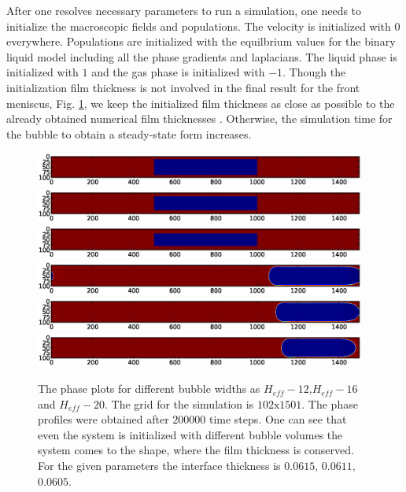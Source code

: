 \documentclass{article}
\begin{document}
After one resolves necessary parameters to run a simulation, one needs to
initialize the macroscopic fields and populations.
The velocity is initialized with $0$ everywhere. Populations are initialized
with the equilbrium values for the binary liquid model including all the phase
gradients and laplacians. The liquid phase is initialized with $1$ and the
gas phase is initialized with $-1$. Though the initialization film thickness
is not involved in the final result for the front meniscus, Fig.
\ref{fig:different:initialization:widths}, we keep the initialized film
thickness as close as possible to the already obtained numerical film
thicknesses \cite{giavedoni-numerical}. Otherwise, the simulation time for the
bubble to obtain a steady-state form increases.
\begin{figure}
\includegraphics*[bb=-20 360 620 430,width=0.97\textwidth]
{Figures/Init/initbegin12.eps}
\includegraphics*[bb=-20 360 620 430,
width=0.97\textwidth]{Figures/Init/initbegin16.eps}
\includegraphics*[bb=-20 360 620 430,
width=0.97\textwidth]{Figures/Init/initbegin20.eps}
\includegraphics*[bb=-20 360 620
430,width=0.97\textwidth]{Figures/Init/initfinish12.eps}\\
\includegraphics*[bb=-20 360 620
430,width=0.97\textwidth]{Figures/Init/initfinish16.eps}\\
\includegraphics*[bb=-20 360 620
430,width=0.97\textwidth]{Figures/Init/initfinish20.eps}\\
\caption{The phase plots for different bubble widths as
$H_{eff}-12$,$H_{eff}-16$ and
$H_{eff}-20$. The grid for the simulation is $102\mathrm{x}1501$. The phase
profiles were obtained after $200000$ time steps. One can see that even the
system is initialized with different bubble volumes the system comes to the
shape, where the film thickness is conserved. For the given parameters the
interface thickness is $0.0615$, $0.0611$, $0.0605$.
\label{fig:different:initialization:widths}}
\end{figure}
\end{document}
